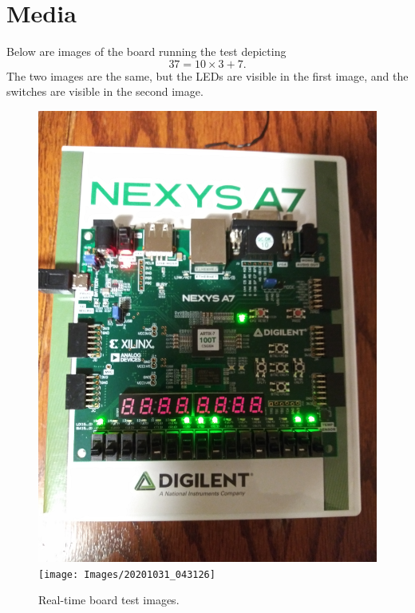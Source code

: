 \documentclass{article}
\begin{document}
\pagebreak

\section{Media}

Below are images of the board running the test depicting
\begin{equation*}
    37 = 10\times3 + 7.
\end{equation*} The two images are the same, but the LEDs
are visible in the first image, and the switches are visible
in the second image.

\begin{figure}[H]
    \centering
    \includegraphics[width=\textwidth]{Images/20201031_043059}
    \texttt{[image: Images/20201031\_043126]}
    \caption{Real-time board test images.}
    \label{board}
\end{figure}
\end{document}
